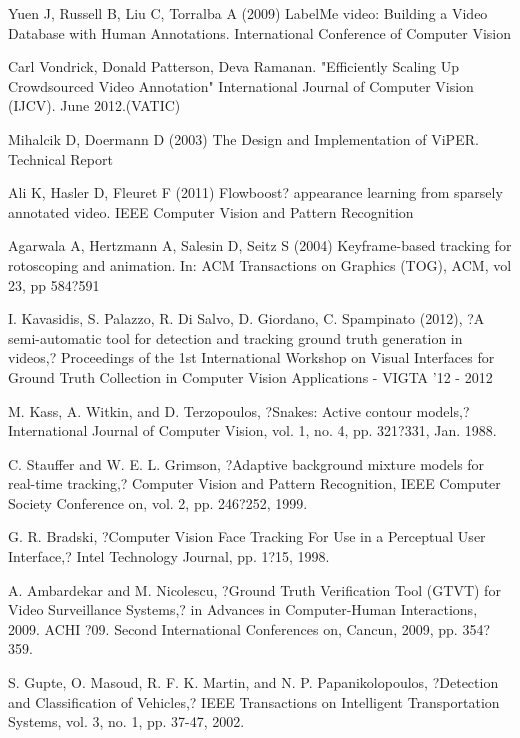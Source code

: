 \documentclass[conference]{IEEEtran}
\begin{document}
\begin{thebibliography}{9}
Yuen J, Russell B, Liu C, Torralba A (2009) LabelMe video: Building a Video Database with Human Annotations. International Conference of Computer Vision

Carl Vondrick, Donald Patterson, Deva Ramanan. "Efficiently Scaling Up
Crowdsourced Video Annotation" International Journal of Computer Vision
(IJCV). June 2012.(VATIC)

Mihalcik D, Doermann D (2003) The Design and Implementation of ViPER. Technical Report 

Ali K, Hasler D, Fleuret F (2011) Flowboost? appearance learning from sparsely annotated video. IEEE Computer Vision and Pattern Recognition 

Agarwala A, Hertzmann A, Salesin D, Seitz S (2004) Keyframe-based tracking for rotoscoping and animation. In: ACM Transactions on Graphics (TOG), ACM, vol 23, pp 584?591

I. Kavasidis, S. Palazzo, R. Di Salvo, D. Giordano, C. Spampinato (2012), ?A semi-automatic tool for detection and tracking ground truth generation in videos,? Proceedings of the 1st International Workshop on Visual Interfaces for Ground Truth Collection in Computer Vision Applications - VIGTA '12 - 2012

M. Kass, A. Witkin, and D. Terzopoulos, ?Snakes: Active contour models,? International Journal of Computer Vision, vol. 1, no. 4, pp. 321?331, Jan. 1988.	

C. Stauffer and W. E. L. Grimson, ?Adaptive background mixture models for real-time tracking,? Computer Vision and Pattern Recognition, IEEE Computer Society Conference on, vol. 2, pp. 246?252, 1999.

G. R. Bradski, ?Computer Vision Face Tracking For Use in a Perceptual User Interface,? Intel Technology Journal, pp. 1?15, 1998.

A. Ambardekar and M. Nicolescu, ?Ground Truth Verification Tool (GTVT) for Video Surveillance Systems,? in Advances in Computer-Human Interactions, 2009. ACHI ?09. Second International Conferences on, Cancun, 2009, pp. 354?359.	

S. Gupte, O. Masoud, R. F. K. Martin, and N. P. Papanikolopoulos, ?Detection and Classification of Vehicles,? IEEE Transactions on Intelligent Transportation Systems, vol. 3, no. 1, pp. 37-47, 2002. 


\end{thebibliography}
\end{document}
